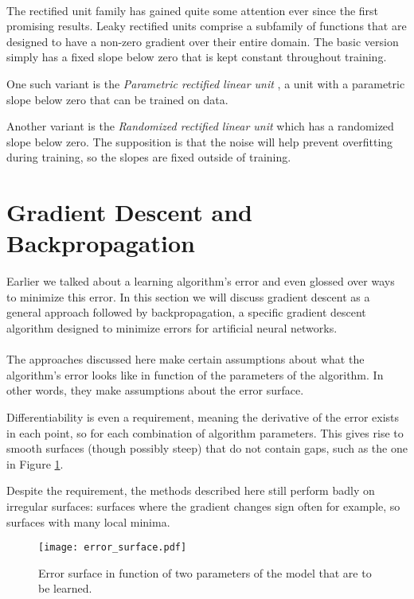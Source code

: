 \paragraph{}
The rectified unit family has gained quite some attention
ever since the first promising results.
Leaky rectified units comprise a subfamily
of functions that are designed to have a non-zero
gradient over their entire domain.
The basic version simply
has a fixed slope below zero
that is kept constant throughout training.

One such variant is the
\textit{Parametric rectified linear unit}
\parencite{He2015a},
a unit with a parametric slope below zero
that can be trained on data.

Another variant is the
\textit{Randomized rectified linear unit}
which has a randomized slope below zero.
The supposition is that the noise
will help prevent overfitting during training,
so the slopes are fixed outside of training.


\section{Gradient Descent and Backpropagation}
\label{sec:backprop}
Earlier we talked about a learning algorithm's error
and even glossed over ways to minimize this error.
In this section we will discuss gradient descent
as a general approach
followed by backpropagation,
a specific gradient descent algorithm
designed to minimize errors
for artificial neural networks.

\paragraph{}
The approaches discussed here
make certain assumptions about
what the algorithm's error looks like
in function of the parameters of the algorithm.
In other words, they make assumptions
about the error surface.

Differentiability is even a requirement,
meaning the derivative of the error
exists in each point,
so for each combination of algorithm parameters.
This gives rise to smooth surfaces
(though possibly steep)
that do not contain gaps,
such as the one in
Figure \ref{fig:error_surface}.

Despite the requirement,
the methods described here still perform badly
on irregular surfaces:
surfaces where the gradient changes sign often for example,
so surfaces with many local minima.

\begin{figure}[ht]
  \centering
  \texttt{[image: error\_surface.pdf]}
  \caption[Error surface]{Error surface in function of two parameters of the model
  that are to be learned.}
  \label{fig:error_surface}
\end{figure}

